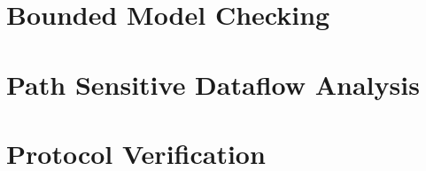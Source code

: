 \section{Bounded Model Checking} \label{sec:bounded-model-checking}

\section{Path Sensitive Dataflow Analysis}

\section{Protocol Verification}
